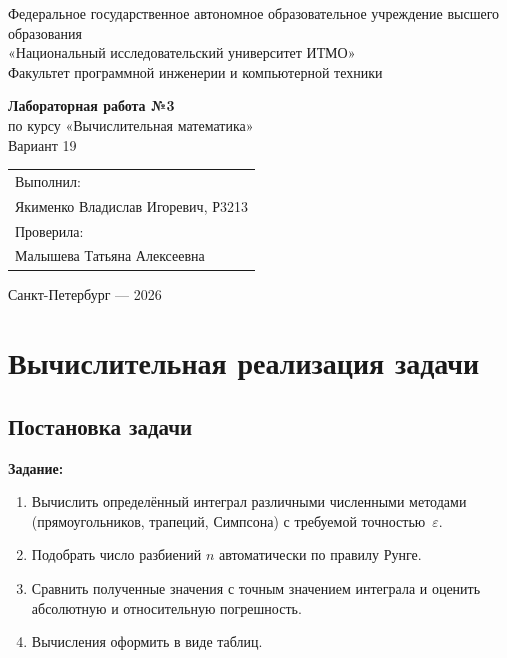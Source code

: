\documentclass[12pt,a4paper]{article}
\begin{document}
\hypersetup{pageanchor=false}
\begin{titlepage}
  \thispagestyle{empty}
  \begin{center}
    {\small Федеральное государственное автономное образовательное учреждение высшего образования\\
    «Национальный исследовательский университет ИТМО»}\\[0.8em]
    {\small Факультет программной инженерии и компьютерной техники}

    \vfill

    {\Large\textbf{Лабораторная работа №3}}\\[0.6em]
    {\large по курсу «Вычислительная математика»}\\[0.6em]
    {\large Вариант 19}

    \vfill

    \begin{flushright}
      \begin{tabular}{l}
        Выполнил:\\
        Якименко Владислав Игоревич, Р3213\\[0.8em]
        Проверила:\\
        Малышева Татьяна Алексеевна
      \end{tabular}
    \end{flushright}

    \vfill

    Санкт-Петербург --- 2026
  \end{center}
\end{titlepage}
\clearpage
\hypersetup{pageanchor=true}

\tableofcontents
\thispagestyle{empty}
\clearpage
{}

\section{Вычислительная реализация задачи}

\subsection{Постановка задачи}

\textbf{Задание:}
\begin{enumerate}[label=\arabic*., leftmargin=1.2cm]
  \item Вычислить определённый интеграл различными численными методами
        (прямоугольников, трапеций, Симпсона) с требуемой точностью~$\varepsilon$.
  \item Подобрать число разбиений $n$ автоматически по правилу Рунге.
  \item Сравнить полученные значения с точным значением интеграла и оценить
        абсолютную и относительную погрешность.
  \item Вычисления оформить в виде таблиц.
\end{enumerate}
\end{document}
